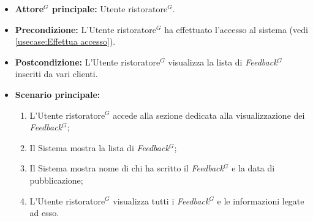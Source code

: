 \label{usecase:Visualizzazione lista \gls{Feedback}$^G$}
\begin{itemize}
	\item \textbf{\gls{Attore}$^G$ principale:} \gls{Utente ristoratore}$^G$.

	\item \textbf{Precondizione:} L'\gls{Utente ristoratore}$^G$ ha effettuato l'accesso al sistema (vedi \autoref{usecase:Effettua accesso}).

	\item \textbf{Postcondizione:} L'\gls{Utente ristoratore}$^G$ visualizza la lista di \textit{\gls{Feedback}$^G$} inseriti da vari clienti.


	\item \textbf{Scenario principale:}
	      \begin{enumerate}
		      \item L'\gls{Utente ristoratore}$^G$ accede alla sezione dedicata alla visualizzazione dei \textit{\gls{Feedback}$^G$};

		      \item Il Sistema mostra la lista di \textit{\gls{Feedback}$^G$};

		      \item Il Sistema mostra nome di chi ha scritto il \textit{\gls{Feedback}$^G$} e la data di pubblicazione;

		      \item L'\gls{Utente ristoratore}$^G$ visualizza tutti i \textit{\gls{Feedback}$^G$} e le informazioni legate ad esso.
	      \end{enumerate}
\end{itemize}
